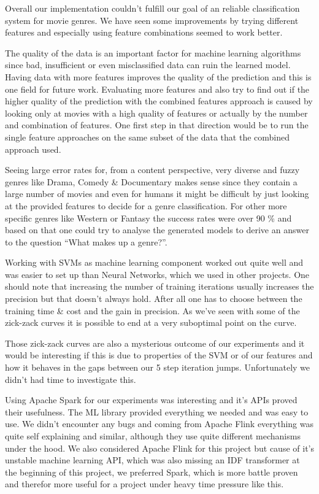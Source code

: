 \documentclass{vldb}
\begin{document}
\par Overall our implementation couldn't fulfill our goal of an reliable classification system for movie genres. We have seen some improvements by trying different features and especially using feature combinations seemed to work better.
\par The quality of the data is an important factor for machine learning algorithms since bad, insufficient or even misclassified data can ruin the learned model. Having data with more features improves the quality of the prediction and this is one field for future work. Evaluating more features and also try to find out if the higher quality of the prediction with the combined features approach is caused by looking only at movies with a high quality of features or actually by the number and combination of features. One first step in that direction would be to run the single feature approaches on the same subset of the data that the combined approach used.
\par Seeing large error rates for, from a content perspective, very diverse and fuzzy genres like Drama, Comedy \& Documentary makes sense since they contain a large number of movies and even for humans it might be difficult by just looking at the provided features to decide for a genre classification. For other more specific genres like Western or Fantasy the success rates were over 90 \% and based on that one could try to analyse the generated models to derive an answer to the question “What makes up a genre?”.
\par Working with SVMs as machine learning component worked out quite well and was easier to set up than Neural Networks, which we used in other projects. One should note that increasing the number of training iterations usually increases the precision but that doesn't always hold. After all one has to choose between the training time \& cost and the gain in precision. As we've seen with some of the zick-zack curves it is possible to end at a very suboptimal point on the curve.
\par Those zick-zack curves are also a mysterious outcome of our experiments and it would be interesting if this is due to properties of the SVM or of our features and how it behaves in the gaps between our 5 step iteration jumps. Unfortunately we didn't had time to investigate this.
\par Using Apache Spark for our experiments was interesting and it's APIs proved their usefulness. The ML library provided everything we needed and was easy to use. We didn't encounter any bugs and coming from Apache Flink everything was quite self explaining and similar, although they use quite different mechanisms under the hood. We also considered Apache Flink for this project but cause of it's unstable machine learning API, which was also missing an IDF transformer at the beginning of this project, we preferred Spark, which is more battle proven and therefor more useful for a project under heavy time pressure like this.
\end{document}
